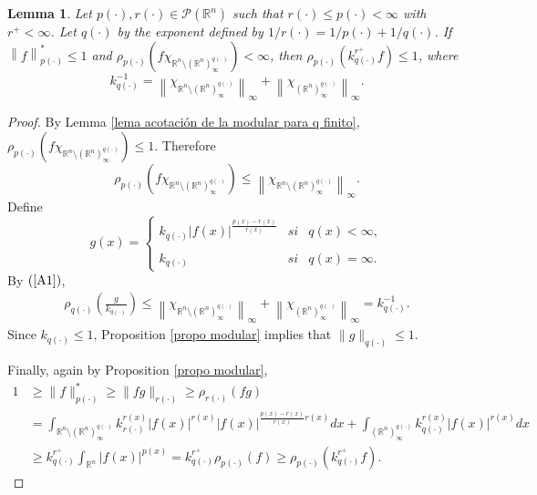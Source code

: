 \documentclass[a4paper,11pt,reqno]{amsart}
\theoremstyle{plain}
\numberwithin{equation}{section}
\newtheorem{lema}[teo]{Lemma}
\theoremstyle{definition}
\newcommand{\R}{{\mathbb{R}^n}}
\begin{document}
\begin{lema}\label{lema acotación de la modular para p=r}
	Let ${p(\cdot)},{r(\cdot)}\in\mathcal{P}(\R)$ such that $r(\cdot)\leq p(\cdot)<\infty$ with $r^+<\infty$. Let ${q(\cdot)}$ by the exponent defined by $1/r(\cdot)=1/p(\cdot)+1/q(\cdot)$.	If $\left\|f\right\|^\ast_{p(\cdot)}\leq1$ and $\rho_{p(\cdot)}\left(f\chi_{\R\setminus(\R)_\infty^{q(\cdot)}}\right)<\infty$, then $\rho_{p(\cdot)}\left(k_{q(\cdot)}^{r^+}f\right)\leq1$, where
	$$k_{q(\cdot)}^{-1}=\left\|\chi_{\R\setminus(\R)_\infty^{q(\cdot)}}\right\|_\infty+\left\|\chi_{(\R)_\infty^{q(\cdot)}}\right\|_\infty.$$
\end{lema}
\begin{proof}
	By Lemma \ref{lema acotación de la modular para q finito}, $\rho_{p(\cdot)}\left(f\chi_{\R\setminus(\R)_\infty^{q(\cdot)}}\right)\leq1$. Therefore
	\begin{equation}\label{A1}
		\rho_{p(\cdot)}\left(f\chi_{\R\setminus(\R)_\infty^{q(\cdot)}}\right)\leq\left\| \chi_{\R\setminus(\R)^{q(\cdot)}_\infty}\right\|_\infty.
	\end{equation} 
	Define
	$$	 g(x)= \left\{ \begin{array}{lcc} k_{q(\cdot)}|f(x)|^\frac{p(x)-r(x)}{r(x)} & si & q(x)<\infty,\\ \\
	k_{q(\cdot)} & si & q(x)=\infty.\end{array} \right. $$
	By $(\ref{A1})$,
	\begin{align*}
		\rho_{q(\cdot)}\left(\frac{g}{k_{q(\cdot)}}\right)\leq\left\|\chi_{\R\setminus(\R)_\infty^{q(\cdot)}}\right\|_\infty+\left\|\chi_{(\R)^{q(\cdot)}_\infty}\right\|_\infty=k_{q(\cdot)}^{-1}.
	\end{align*}
	Since $k_{q(\cdot)}\leq 1$, Proposition \ref{propo modular} implies that $\|g\|_{q(\cdot)}\leq1$.
	
	Finally, again by Proposition \ref{propo modular},
	\begin{align*}
		1&\geq\|f\|^\ast_{p(\cdot)}\geq\|fg\|_{r(\cdot)}\geq\rho_{r(\cdot)}(fg)\\
		&= \int_{\R\setminus(\R)^{q(\cdot)}_\infty}k_{r(\cdot)}^{r(x)}|f(x)|^{r(x)}|f(x)|^{\frac{p(x)-r(x)}{r(x)}r(x)}dx+\int_{(\R)_\infty^{q(\cdot)}}k_{q(\cdot)}^{r(x)}|f(x)|^{r(x)}dx\\
		&\geq k_{q(\cdot)}^{r^+}\int_\R |f(x)|^{p(x)}=k^{r^+}_{q(\cdot)}\rho_{p(\cdot)}(f)\geq\rho_{p(\cdot)}(k^{r^+}_{q(\cdot)} f).
	\end{align*}	
\end{proof}
\end{document}
